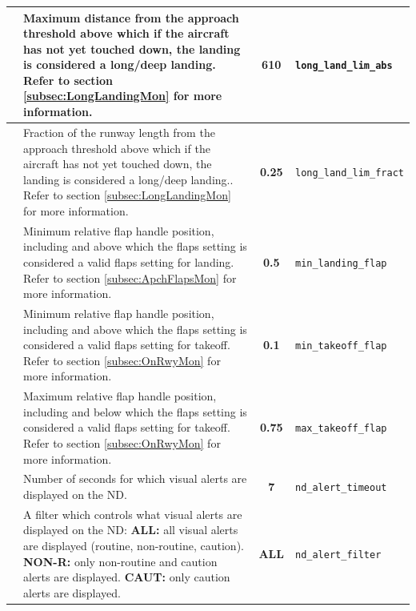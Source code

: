 \documentclass[a4paper,12pt]{article}
\newcommand{\confopt}[1]{\texttt{#1}}
\begin{document}
{\begin{center}
\begin{supertabular}{|c|p{8cm}|c|l|}
\hline

 &
Maximum distance from the approach threshold above which if the aircraft
has not yet touched down, the landing is considered a long/deep
landing.\newline
Refer to section \ref{subsec:LongLandingMon} for more information. &
\textbf{610} & \confopt{long\_land\_lim\_abs} \\

\hline

 &
Fraction of the runway length from the approach threshold above which if
the aircraft has not yet touched down, the landing is considered a
long/deep landing..\newline
Refer to section \ref{subsec:LongLandingMon} for more information. &
\textbf{0.25} & \confopt{long\_land\_lim\_fract} \\

\hline

 &
Minimum relative flap handle position, including and above which the
flaps setting is considered a valid flaps setting for landing.\newline
Refer to section \ref{subsec:ApchFlapsMon} for more information. &
\textbf{0.5} & \confopt{min\_landing\_flap} \\

\hline

 &
Minimum relative flap handle position, including and above which the
flaps setting is considered a valid flaps setting for takeoff.\newline
Refer to section \ref{subsec:OnRwyMon} for more information. &
\textbf{0.1} & \confopt{min\_takeoff\_flap} \\

\hline

 &
Maximum relative flap handle position, including and below which the
flaps setting is considered a valid flaps setting for takeoff.\newline
Refer to section \ref{subsec:OnRwyMon} for more information. &
\textbf{0.75} & \confopt{max\_takeoff\_flap} \\

\hline

 &
Number of seconds for which visual alerts are displayed on the ND. &
\textbf{7} & \confopt{nd\_alert\_timeout} \\

\hline

 &
A filter which controls what visual alerts are displayed on the
ND:\newline
\textbf{ALL:} all visual alerts are displayed (routine, non-routine,
caution).\newline
\textbf{NON-R:} only non-routine and caution alerts are displayed.\newline
\textbf{CAUT:} only caution alerts are displayed. & \textbf{ALL} &
\confopt{nd\_alert\_filter} \\


\end{supertabular}
\end{center}}
\end{document}
